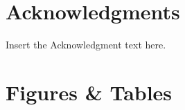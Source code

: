 \documentclass[]{rsos}%
\begin{document}
\section*{Acknowledgments}
Insert the Acknowledgment text here.




\linespread{1}\selectfont %



\pagebreak



\section*{Figures \& Tables}


\linespread{1.3}\selectfont %
\end{document}
